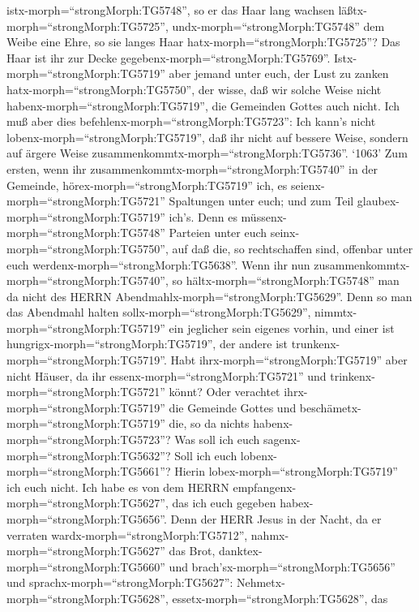 istx-morph=``strongMorph:TG5748'', so er das Haar lang wachsen
läßtx-morph=``strongMorph:TG5725'', 
undx-morph=``strongMorph:TG5748'' dem Weibe eine Ehre, so sie langes
Haar hatx-morph=``strongMorph:TG5725''? Das Haar ist ihr zur Decke
gegebenx-morph=``strongMorph:TG5769''. 
Istx-morph=``strongMorph:TG5719'' aber jemand unter euch, der Lust zu
zanken hatx-morph=``strongMorph:TG5750'', der wisse, daß wir solche
Weise nicht habenx-morph=``strongMorph:TG5719'', die Gemeinden Gottes
auch nicht.  Ich muß aber dies
befehlenx-morph=``strongMorph:TG5723'': Ich kann's nicht
lobenx-morph=``strongMorph:TG5719'', daß ihr nicht auf bessere Weise,
sondern auf ärgere Weise zusammenkommtx-morph=``strongMorph:TG5736''.
 `1063' Zum ersten, wenn ihr
zusammenkommtx-morph=``strongMorph:TG5740'' in der Gemeinde,
hörex-morph=``strongMorph:TG5719'' ich, es
seienx-morph=``strongMorph:TG5721'' Spaltungen unter euch; und zum Teil
glaubex-morph=``strongMorph:TG5719'' ich's.  Denn es
müssenx-morph=``strongMorph:TG5748'' Parteien unter euch
seinx-morph=``strongMorph:TG5750'', auf daß die, so rechtschaffen sind,
offenbar unter euch werdenx-morph=``strongMorph:TG5638''. 
Wenn ihr nun zusammenkommtx-morph=``strongMorph:TG5740'', so
hältx-morph=``strongMorph:TG5748'' man da nicht des HERRN
Abendmahlx-morph=``strongMorph:TG5629''.  Denn so man das
Abendmahl halten sollx-morph=``strongMorph:TG5629'',
nimmtx-morph=``strongMorph:TG5719'' ein jeglicher sein eigenes vorhin,
und einer ist hungrigx-morph=``strongMorph:TG5719'', der andere ist
trunkenx-morph=``strongMorph:TG5719''.  Habt
ihrx-morph=``strongMorph:TG5719'' aber nicht Häuser, da ihr
essenx-morph=``strongMorph:TG5721'' und
trinkenx-morph=``strongMorph:TG5721'' könnt? Oder verachtet
ihrx-morph=``strongMorph:TG5719'' die Gemeinde Gottes und
beschämetx-morph=``strongMorph:TG5719'' die, so da nichts
habenx-morph=``strongMorph:TG5723''? Was soll ich euch
sagenx-morph=``strongMorph:TG5632''? Soll ich euch
lobenx-morph=``strongMorph:TG5661''? Hierin
lobex-morph=``strongMorph:TG5719'' ich euch nicht.  Ich
habe es von dem HERRN empfangenx-morph=``strongMorph:TG5627'', das ich
euch gegeben habex-morph=``strongMorph:TG5656''. Denn der HERR Jesus in
der Nacht, da er verraten wardx-morph=``strongMorph:TG5712'',
nahmx-morph=``strongMorph:TG5627'' das Brot, 
danktex-morph=``strongMorph:TG5660'' und
brach'sx-morph=``strongMorph:TG5656'' und
sprachx-morph=``strongMorph:TG5627'':
Nehmetx-morph=``strongMorph:TG5628'',
essetx-morph=``strongMorph:TG5628'', das
